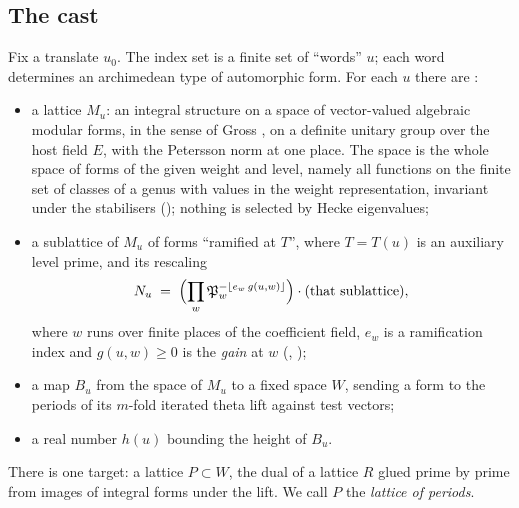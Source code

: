\subsection{The cast}\label{sec:cast}
Fix a translate $u_0$. The index set is a finite set of ``words'' $u$; each word determines
an archimedean type of automorphic form. For each $u$ there are \lvS:
\begin{itemize}
\item a lattice $M_u$: an integral structure on a space of vector-valued algebraic modular
  forms, in the sense of Gross \cite{gross1999}, on a definite unitary group over the host
  field $E$, with the Petersson norm at one place. The space is the whole space of forms of
  the given weight and level, namely all functions on the finite set of classes of a genus
  with values in the weight representation, invariant under the stabilisers
  (); nothing is selected by Hecke eigenvalues;
\item a sublattice of $M_u$ of forms ``ramified at $T$'', where $T=T(u)$ is an auxiliary level
  prime, and its rescaling
  \begin{equation}\label{eq:Nu}
  N_u\;=\;\Bigl(\prod_{w}\mathfrak{P}_w^{-\lfloor e_w\,g(u,w)\rfloor}\Bigr)\cdot(\text{that sublattice}),
  \end{equation}
  where $w$ runs over finite places of the coefficient field, $e_w$ is a ramification index
  and $g(u,w)\ge0$ is the \emph{gain} at $w$ (, );
\item a map $B_u$ from the space of $M_u$ to a fixed space $W$, sending a form to the periods
  of its $m$-fold iterated theta lift against test vectors;
\item a real number $h(u)$ bounding the height of $B_u$.
\end{itemize}
There is one target: a lattice $P\subset W$, the dual of a lattice $R$ glued prime by prime
from images of integral forms under the lift. We call $P$ the \emph{lattice of periods}.

